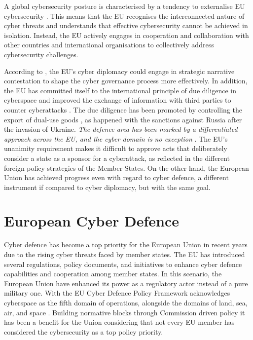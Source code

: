 A global cybersecurity posture is characterised by a tendency to externalise EU cybersecurity \autocite{miadzvetskaya_2021_the}. This means that the EU recognises the interconnected nature of cyber threats and understands that effective cybersecurity cannot be achieved in isolation. Instead, the EU actively engages in cooperation and collaboration with other countries and international organisations to collectively address cybersecurity challenges.

According to \textcite{kurowska_2019_the}, the EU’s cyber diplomacy could engage in strategic narrative contestation to shape the cyber governance process more effectively. In addition, the EU has committed itself to the international principle of due diligence in cyberspace and improved the exchange of information with third parties to counter cyberattacks \autocite{bendiek_2018_the}. The due diligence has been promoted by controlling the export of dual-use goods \autocite{bendiek_2018_the}, as happened with the sanctions against Russia after the invasion of Ukraine. \textit{The defence area has been marked by a differentiated approach across the EU, and the cyber domain is no exception}  \autocite[426]{miadzvetskaya_2021_the}. The EU’s unanimity requirement makes it difficult to approve acts that deliberately consider a state as a sponsor for a cyberattack, as reflected in the different foreign policy strategies of the Member States. On the other hand, the European Union has achieved progress even with regard to cyber defence, a different instrument if compared to cyber diplomacy, but with the same goal. 

\section{European Cyber Defence}

Cyber defence has become a top priority for the European Union in recent years due to the rising cyber threats faced by member states.  The EU has introduced several regulations, policy documents, and initiatives to enhance cyber defence capabilities and cooperation among member states. In this scenario, the European Union have enhanced its power as a regulatory actor instead of a pure military one. With the EU Cyber Defence Policy Framework acknowledges cyberspace as the fifth domain of operations, alongside the domains of land, sea, air, and space \autocite{counciloftheeuropeanunion_2018_council}. Building normative blocks through Commission driven policy it has been a benefit for the Union considering that not every EU member has considered the cybersecurity as a top policy priority. 

